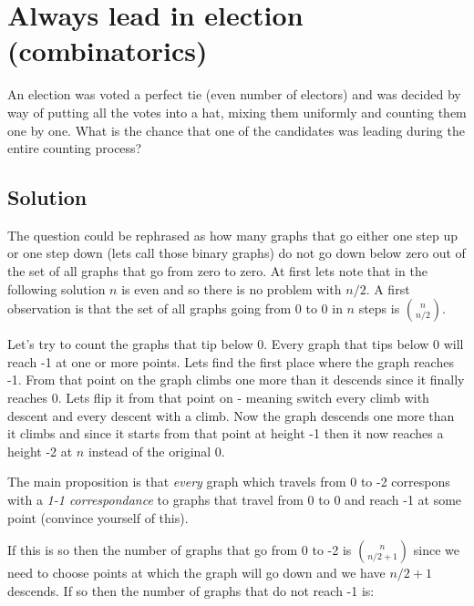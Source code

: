 \documentclass{article}
\begin{document}
\section{Always lead in election (combinatorics)}



An election was voted a perfect tie (even number of electors) and was decided by way of putting
all the votes into a hat, mixing them uniformly and counting them one by one. What is the chance
that one of the candidates was leading during the entire counting process?

\subsection{Solution}

The question could be rephrased as how many graphs that go either one step up or one step down (lets call those binary graphs) do not go down below zero out of the set of all graphs that go from zero to zero. At first lets note that in the following solution $n$ is even and so there is no problem with $n/2$. A first observation is that the set of all graphs going from 0 to 0 in $n$ steps is ${n \choose n/2}$.

Let's try to count the graphs that tip below 0. Every graph that tips below 0 will reach -1 at one or more points. Lets find the first place where the graph reaches -1. From that point on the graph climbs one more than it descends since it finally reaches 0. Lets flip it from that point on - meaning switch every climb with descent and every descent with a climb. Now the graph descends one more than it climbs and since it starts from that point at height -1 then it now reaches a height -2 at $n$ instead of the original 0.

The main proposition is that \emph{every} graph which travels from 0 to -2 correspons with a \emph{1-1 correspondance} to graphs that travel from 0 to 0 and reach -1 at some point (convince yourself
of this).

If this is so then the number of graphs that go from 0 to -2 is ${n \choose n/2+1}$ since we need to
choose points at which the graph will go down and we have $n/2+1$ descends. If so then the number of
graphs that do not reach -1 is:
\end{document}
